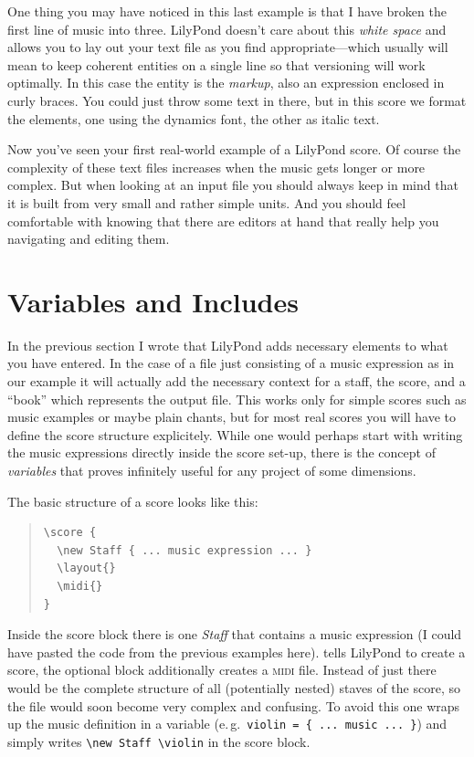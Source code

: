 \documentclass[DIV=12]{scrreprt}
\begin{document}
One thing you may have noticed in this last example is that I have broken the first line of music into three.
LilyPond doesn't care about this \emph{white space} and allows you to lay out your text file as you find appropriate---which usually will mean to keep coherent entities on a single line so that versioning will work optimally.
In this case the entity is the \emph{markup}, also an expression enclosed in curly braces.
You could just throw some text in there, but in this score we format the elements, one using the dynamics font, the other as italic text.

\medskip
Now you've seen your first real-world example of a LilyPond score.
Of course the complexity of these text files increases when the music gets longer or more complex.
But when looking at an input file you should always keep in mind that it is built from very small and rather simple units.
And you should feel comfortable with knowing that there are editors at hand that really help you navigating and editing them.

\section{Variables and Includes}
\label{sec:pt_variables-includes}
In the previous section I wrote that LilyPond adds necessary elements to what you have entered.
In the case of a file just consisting of a music expression as in our example it will actually add the necessary context for a staff, the score, and a “book” which represents the output file.
This works only for simple scores such as music examples or maybe plain chants, but for most real scores you will have to define the score structure explicitely.
While one would perhaps start with writing the music expressions directly inside the score set-up, there is the concept of \emph{variables} that proves infinitely useful for any project of some dimensions.

The basic structure of a score looks like this:
\begin{quote}
\begin{verbatim}
\score {
  \new Staff { ... music expression ... }
  \layout{}
  \midi{}
}
\end{verbatim}
\end{quote}

Inside the score block there is one \emph{Staff} that contains a music expression (I could have pasted the code from the previous examples here).  tells LilyPond to create a score, the optional  block additionally creates a \textsc{midi} file.
Instead of just  there would be the complete structure of all (potentially nested) staves of the score, so the file would soon become very complex and confusing.
To avoid this one wraps up the music definition in a variable (e.\,g.\ \texttt{violin = \{ ... music ... \}}) and simply writes \verb+\new Staff \violin+ in the score block.
\end{document}
